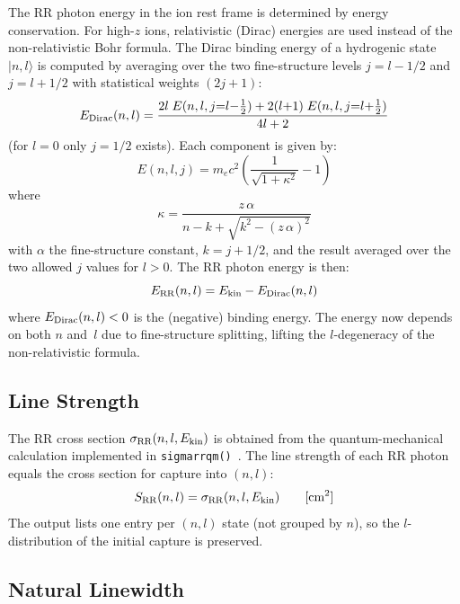 \documentclass[11pt,a4paper]{article}
\begin{document}
The RR photon energy in the ion rest frame is determined by energy
conservation.  For high-$z$ ions, relativistic (Dirac) energies are
used instead of the non-relativistic Bohr formula.  The Dirac binding
energy of a hydrogenic state $|n,l\rangle$ is computed by averaging over
the two fine-structure levels $j = l - 1/2$ and $j = l + 1/2$ with
statistical weights $(2j{+}1)$:
\begin{equation}
  E_{\rm Dirac}(n,l) = \frac{2l\; E(n,l,j{=}l{-}\tfrac{1}{2})
    + 2(l{+}1)\; E(n,l,j{=}l{+}\tfrac{1}{2})}{4l + 2}
  \label{eq:Dirac}
\end{equation}
(for $l = 0$ only $j = 1/2$ exists).  Each component is
given by:
\begin{equation}
  E(n,l,j) = m_e c^2
  \left(\frac{1}{\sqrt{1 + \kappa^2}} - 1\right)
  \label{eq:Diraccomp}
\end{equation}
where
\begin{equation}
  \kappa = \frac{z\,\alpha}{n - k + \sqrt{k^2 - (z\,\alpha)^2}}
  \label{eq:kappa}
\end{equation}
with $\alpha$ the fine-structure constant, $k = j + 1/2$, and the
result averaged over the two allowed $j$ values for $l > 0$.  The RR
photon energy is then:
\begin{equation}
  E_{\rm RR}(n,l) = E_{\rm kin} - E_{\rm Dirac}(n,l)
  \label{eq:ERR}
\end{equation}
where $E_{\rm Dirac}(n,l) < 0$ is the (negative) binding energy.  The
energy now depends on both $n$ and~$l$ due to fine-structure splitting,
lifting the $l$-degeneracy of the non-relativistic formula.

\subsection{Line Strength}

The RR cross section $\sigma_{\rm RR}(n,l,E_{\rm kin})$ is obtained
from the quantum-mechanical calculation implemented in
\texttt{sigmarrqm()}~\cite{Schippers2002c}.  The line strength of each
RR photon equals the cross section for capture into $(n,l)$:
\begin{equation}
  S_{\rm RR}(n,l) = \sigma_{\rm RR}(n,l,E_{\rm kin})
  \qquad [\text{cm}^2]
  \label{eq:SRR}
\end{equation}
The output lists one entry per $(n,l)$ state (not grouped by $n$), so
the $l$-distribution of the initial capture is preserved.

\subsection{Natural Linewidth}
\end{document}
